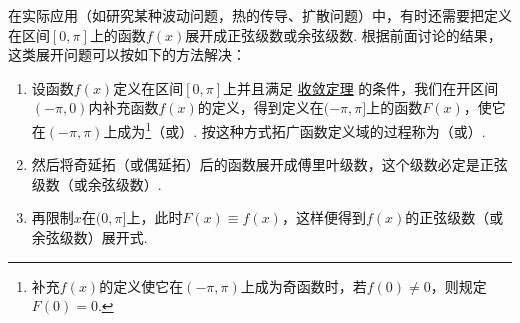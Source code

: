 在实际应用（如研究某种波动问题，热的传导、扩散问题）中，有时还需要把定义在区间\([0,\pi]\)上的函数\(f(x)\)展开成正弦级数或余弦级数.
根据前面讨论的结果，这类展开问题可以按如下的方法解决：
\begin{enumerate}
\item 设函数\(f(x)\)定义在区间\([0,\pi]\)上并且满足 \hyperref[theorem:无穷级数.傅里叶级数收敛的狄利克雷充分条件]{收敛定理} 的条件，我们在开区间\((-\pi,0)\)内补充函数\(f(x)\)的定义，得到定义在\((-\pi,\pi]\)上的函数\(F(x)\)，使它在\((-\pi,\pi)\)上成为\footnote{补充\(f(x)\)的定义使它在\((-\pi,\pi)\)上成为奇函数时，若\(f(0)\neq0\)，则规定\(F(0)=0\).}（或）.
按这种方式拓广函数定义域的过程称为（或）.
\item 然后将奇延拓（或偶延拓）后的函数展开成傅里叶级数，这个级数必定是正弦级数（或余弦级数）.
\item 再限制\(x\)在\((0,\pi]\)上，此时\(F(x)\equiv f(x)\)，这样便得到\(f(x)\)的正弦级数（或余弦级数）展开式.
\end{enumerate}

